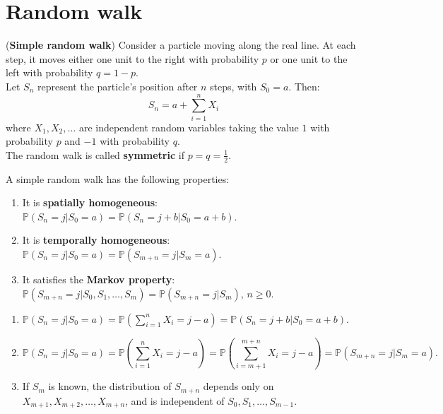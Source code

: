 \documentclass{huhtakm-template-book}
\newcommand{\prob}{\mathbb{P}}
\begin{document}
\appendix
\renewcommand{\thechapter}{\Alph{chapter}}
    
\chapter{Random walk}
    \label{Simple random walk}
    \begin{eg}(\textbf{Simple random walk})
        Consider a particle moving along the real line. At each step, it moves either one unit to the right with probability $p$ or one unit to the left with probability $q=1-p$.\\
        Let $S_{n}$ represent the particle's position after $n$ steps, with $S_{0}=a$. Then:
        \begin{equation*}
            S_{n}=a+\sum_{i=1}^{n}X_{i}
        \end{equation*}
        where $X_{1},X_{2},\dots$ are independent random variables taking the value $1$ with probability $p$ and $-1$ with probability $q$.\\
        The random walk is called \textbf{symmetric} if $p=q=\frac{1}{2}$.
    \end{eg}
    \begin{lem}
        \label{Simple random walk properties}
        A simple random walk has the following properties:
        \begin{enumerate}
            \item It is \textbf{spatially homogeneous}: $\prob(S_{n}=j|S_{0}=a)=\prob(S_{n}=j+b|S_{0}=a+b)$.
            \item It is \textbf{temporally homogeneous}: $\prob(S_{n}=j|S_{0}=a)=\prob(S_{m+n}=j|S_{m}=a)$.
            \item It satisfies the \textbf{Markov property}: $\prob(S_{m+n}=j|S_{0},S_{1},\dots,S_{m})=\prob(S_{m+n}=j|S_{m})$, $n\geq 0$.
        \end{enumerate}
    \end{lem}
    \begin{proofing}
            \begin{enumerate}
                \item $\prob(S_{n}=j|S_{0}=a)=\prob(\sum_{i=1}^{n}X_{i}=j-a)=\prob(S_{n}=j+b|S_{0}=a+b)$.
                \item 
                \begin{equation*}
                    \prob(S_{n}=j|S_{0}=a)=\prob\left(\sum_{i=1}^{n}X_{i}=j-a\right)=\prob\left(\sum_{i=m+1}^{m+n}X_{i}=j-a\right)=\prob(S_{m+n}=j|S_{m}=a).
                \end{equation*}
                \item If $S_{m}$ is known, the distribution of $S_{m+n}$ depends only on $X_{m+1},X_{m+2},\dots,X_{m+n}$, and is independent of $S_{0},S_{1},\dots,S_{m-1}$.
            \end{enumerate}
    \end{proofing}
\end{document}
